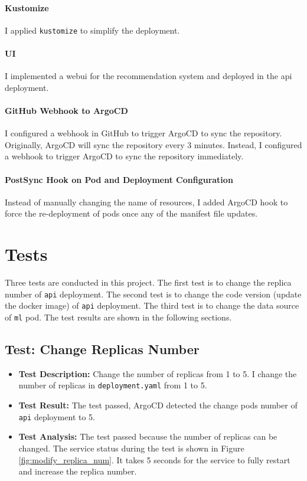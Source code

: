 \documentclass[12pt]{article}
\begin{document}
\paragraph{Kustomize}
I applied \texttt{kustomize} to simplify the deployment.

\paragraph{UI}
I implemented a webui for the recommendation system and deployed in the api deployment.

\paragraph{GitHub Webhook to ArgoCD}
I configured a webhook in GitHub to trigger ArgoCD to sync the repository. Originally, ArgoCD will sync the repository every 3 minutes. Instead, I configured a webhook to trigger ArgoCD to sync the repository immediately.

\paragraph{PostSync Hook on Pod and Deployment Configuration}
Instead of manually changing the name of resources, I added ArgoCD hook to force the re-deployment of pods once any of the manifest file updates.

\section{Tests}

Three tests are conducted in this project. The first test is to change the replica number of \texttt{api} deployment. The second test is to change the code version (update the docker image) of \texttt{api} deployment. The third test is to change the data source of \texttt{ml} pod. The test results are shown in the following sections.

\subsection{Test: Change Replicas Number}

\begin{itemize}
    \item \textbf{Test Description:} Change the number of replicas from 1 to 5. I change the number of replicas in \texttt{deployment.yaml} from 1 to 5.
    \item \textbf{Test Result:} The test passed, ArgoCD detected the change pods number of \texttt{api} deployment to 5.
    \item \textbf{Test Analysis:} The test passed because the number of replicas can be changed. The service status during the test is shown in Figure \ref{fig:modify_replica_num}. It takes 5 seconds for the service to fully restart and increase the replica number.
\end{itemize}
\end{document}
